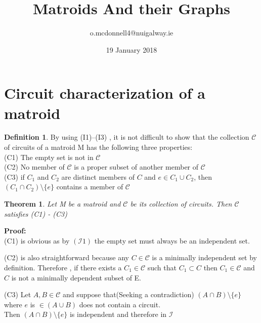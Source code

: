 \documentclass{article}
\title{Matroids And their Graphs}
\author{o.mcdonnell4@nuigalway.ie }
\date{19 January 2018}
\theoremstyle{plain}
\newtheorem{thm}{Theorem}[section]
\theoremstyle{definition}
\newtheorem{defn}{Definition}[section]
\theoremstyle{remark}
\newcommand\Proof{%
    \textbf{Proof:}~%
}
\begin{document}
\maketitle
 
 \section{Circuit characterization of a matroid}

\begin{defn} By using (I1)–(I3) , it is not difficult to show that the collection $\mathcal{C}$ of circuits of a matroid M has the following three properties:\\
(C1) The empty set is not in $\mathcal{C}$\\
(C2) No member of $\mathcal{C}$ is a proper subset of another member of $\mathcal{C}$\\
(C3) if $ C_1 $ and $ C_2 $ are distinct members of $ C $ and 
$ e \in C_1 \cup C_2 $, then $ (C_1 \cap C_2 ) \setminus \{e\} $ contains a member of $\mathcal{C}$ 
 \end{defn}
 
 \vspace{5mm}
 
 \begin{thm}
 Let M be a matroid and $\mathcal{C}$ be its collection of circuits. Then $\mathcal{C}$ satisfies (C1) - (C3)
  \end{thm}
 
 \noindent\textbf\Proof \\
 \noindent (C1) is obvious as by $\mathcal{(I1)}$ the empty set must always be an independent set.
 
 \vspace{2mm}
 
 \noindent (C2) is also straightforward because any $ C \in \mathcal{C} $ is a minimally independent set by definition. Therefore , if there exists a $ C_1 \in \mathcal{C} $ such that $ C_1 \subset C $ then $ C_1 \in \mathcal{C} $ and $ C $ is not a minimally dependent subset of E. 
 
 \vspace{2mm}
 
 \noindent (C3) Let $ A, B \in \mathcal{C} $ and suppose that(Seeking a contradiction) $ (A \cap B) \setminus \{e\} $ where $ e $ is $ \in (A \cup B) $ does not contain a circuit.\\
 \noindent Then $ (A \cap B) \setminus \{e\} $ is independent and therefore in $\mathcal{I}$
 
\end{document}
